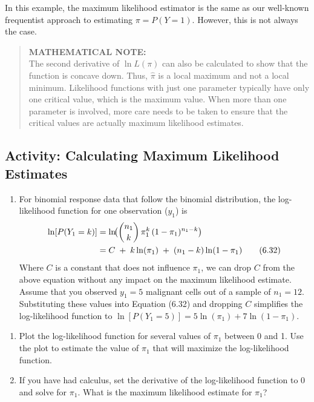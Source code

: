 \documentclass[
]{book}
\providecommand{\tightlist}{%
  \setlength{\itemsep}{0pt}\setlength{\parskip}{0pt}}
\begin{document}
In this example, the maximum likelihood estimator is the same as our well-known frequentist approach to estimating \(\pi = P(Y = 1)\). However, this is not always the case.

\begin{quote}
\textbf{MATHEMATICAL NOTE:}\\
The second derivative of \(\ln L(\pi)\) can also be calculated to show that the function is concave down. Thus, \(\hat{\pi}\) is a local maximum and not a local minimum. Likelihood functions with just one parameter typically have only one critical value, which is the maximum value. When more than one parameter is involved, more care needs to be taken to ensure that the critical values are actually maximum likelihood estimates.
\end{quote}

\hypertarget{activity-calculating-maximum-likelihood-estimates}{%
\subsection*{Activity: Calculating Maximum Likelihood Estimates}\label{activity-calculating-maximum-likelihood-estimates}}

\begin{enumerate}
\def\labelenumi{\arabic{enumi}.}
\setcounter{enumi}{33}
\tightlist
\item
  For binomial response data that follow the binomial distribution, the log-likelihood function for one observation (\(y_1\)) is\\
  \begin{align}
  \ln[P(Y_1 = k)]
  &= \ln\!\bigl(\binom{n_1}{k}\,\pi_1^k\,(1 - \pi_1)^{n_1 - k}\bigr) \notag \\
  &= C \;+\;k\ln(\pi_1)\;+\;(n_1 - k)\ln(1 - \pi_1)
  \tag{6.32}
  \end{align}
  Where \(C\) is a constant that does not influence \(\pi_1\), we can drop \(C\) from the above equation without any impact on the maximum likelihood estimate. Assume that you observed \(y_1 = 5\) malignant cells out of a sample of \(n_1 = 12\). Substituting these values into Equation (6.32) and dropping \(C\) simplifies the log-likelihood function to \(\ln[P(Y_1 = 5)] = 5\ln(\pi_1) + 7\ln(1 - \pi_1).\)
\end{enumerate}

\begin{enumerate}
\def\labelenumi{\alph{enumi}.}
\tightlist
\item
  Plot the log-likelihood function for several values of \(\pi_1\) between 0 and 1. Use the plot to estimate the value of \(\pi_1\) that will maximize the log-likelihood function.\\
\item
  If you have had calculus, set the derivative of the log-likelihood function to 0 and solve for \(\pi_1\). What is the maximum likelihood estimate for \(\pi_1\)?
\end{enumerate}
\end{document}
